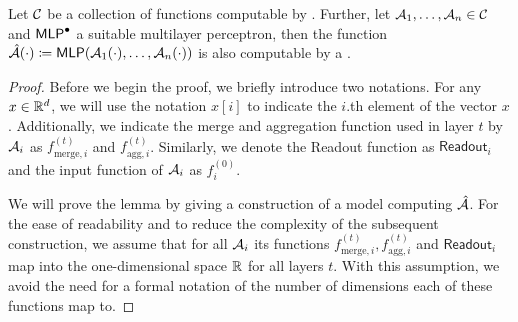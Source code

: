 \begin{lemma}\label{lem:composition_lemma_gnn}
    Let $\mathcal{C}$ be a collection of functions computable by \gnns. Further, let  $\mathcal{A}_1, \dots , \mathcal{A}_n \in \mathcal{C}$ and $\textsf{MLP}^\bullet$ a suitable multilayer perceptron, then the function $\hat{\mathcal{A}}(\cdot) \coloneqq \textsf{MLP}(\mathcal{A}_1(\cdot), \dots, \mathcal{A}_n(\cdot))$ is also computable by a \gnn.
\end{lemma}

\begin{proof}
    Before we begin the proof, we briefly introduce two notations. For any $x \in \mathbb{R}^d$, we will use the notation $x[i]$ to indicate the $i$.th element of the vector $x$. Additionally, we indicate the merge and aggregation function used in layer $t$ by $\mathcal{A}_i$ as $f^{(t)}_{\text{merge}, i}$ and $f^{(t)}_{\text{agg}, i}$. Similarly, we denote the \textsf{Readout} function as $\textsf{Readout}_i$ and the input function of $\mathcal{A}_i$ as $f^{(0)}_i$.
    
    We will prove the lemma by giving a construction of a \gnn model computing $\hat{\mathcal{A}}$. For the ease of readability and to reduce the complexity of the subsequent construction, we assume that for all $\mathcal{A}_i$ its functions $f^{(t)}_{\text{merge}, i}, f^{(t)}_{\text{agg}, i}$ and $\textsf{Readout}_i$ map into the one-dimensional space $\mathbb{R}$ for all layers $t$. With this assumption, we avoid the need for a formal notation of the number of dimensions each of these functions map to.


\end{proof}
